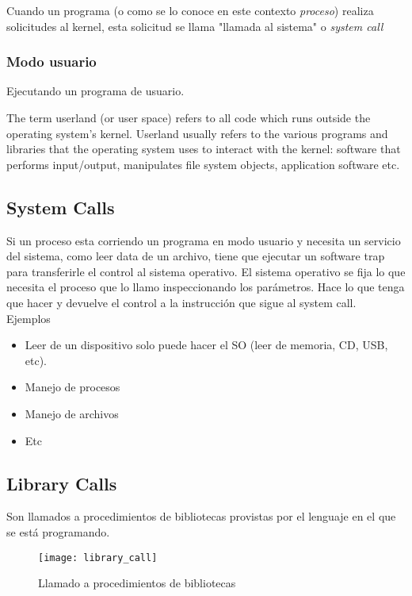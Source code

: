 \documentclass[a4paper, twoside]{article}
\begin{document}
Cuando un programa (o como se lo conoce en este contexto \emph{proceso}) realiza solicitudes al kernel, esta solicitud se llama "llamada al sistema" o \emph{system call}

\subsubsection{Modo usuario}
Ejecutando un programa de usuario.

The term userland (or user space) refers to all code which runs outside the operating system's kernel. Userland usually refers to the various programs and libraries that the operating system uses to interact with the kernel: software that performs input/output, manipulates file system objects, application software etc.

\subsection{System Calls}
Si un proceso esta corriendo un programa en modo usuario y necesita un servicio del sistema, como leer data de un archivo, tiene que ejecutar un software trap para transferirle el control al sistema operativo. El sistema operativo se fija lo que necesita el proceso que lo  llamo inspeccionando los parámetros. Hace lo que tenga que hacer y devuelve el control a la instrucción que sigue al system call.\\

Ejemplos
\begin{itemize}
	\item Leer de un dispositivo solo puede hacer el SO (leer de memoria, CD, USB, etc).
	\item Manejo de procesos
	\item Manejo de archivos
	\item Etc
\end{itemize}

\subsection{Library Calls}
Son llamados a procedimientos de bibliotecas provistas por el lenguaje en el que se está programando.\\

\begin{figure}[H]
	\centering
	\texttt{[image: library\_call]}
	\caption{Llamado a procedimientos de bibliotecas}
	\label{fig:library_call}
\end{figure}
\end{document}
